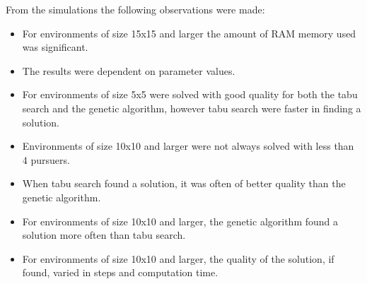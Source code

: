 \newpage From the simulations the following observations were made:
\begin{itemize}
\item{For environments of size 15x15 and larger the amount of RAM memory used was significant.}
\item{The results were dependent on parameter values.}
\item{For environments of size 5x5 were solved with good quality for both the tabu search and the genetic algorithm, however tabu search were faster in finding a solution.}
\item{Environments of size 10x10 and larger were not always solved with less than 4 pursuers.}
\item{When tabu search found a solution, it was often of better quality than the genetic algorithm.}
\item{For environments of size 10x10 and larger, the genetic algorithm found a solution more often than tabu search.}
\item{For environments of size 10x10 and larger, the quality of the solution, if found, varied in steps and computation time.}
\end{itemize}

